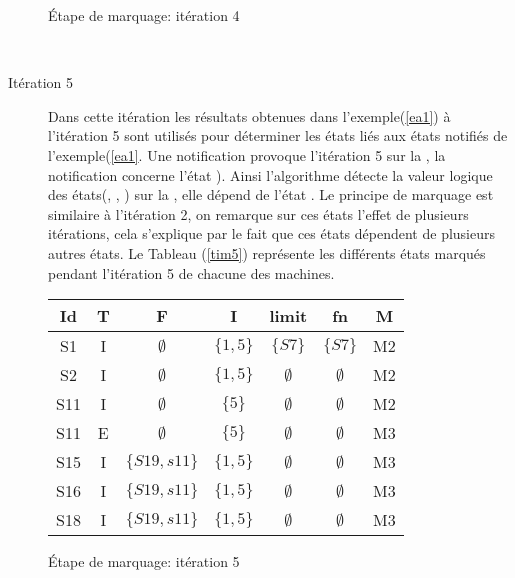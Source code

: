 \begin{Exemple}
\begin{description}
\begin{tableth}
\begin{tabular}{|*{7}{c|}}
	\end{tabular}
	\caption{Étape de marquage: itération 4}\label{tim4}
\end{tableth}\\

	\item[Itération 5] Dans cette itération les résultats obtenues dans l'exemple(\ref{ea1}) à l'itération 5 sont utilisés pour déterminer les états liés aux états notifiés de l'exemple(\ref{ea1}. Une notification provoque l'itération 5 sur la \mtree{}, la notification concerne l'état ). Ainsi l'algorithme détecte la valeur logique des états(, , ) sur la \mtree{}, elle dépend de l'état . Le principe de marquage est similaire à l'itération 2, on remarque sur ces états l'effet de plusieurs itérations, cela s'explique par le fait que ces états dépendent de plusieurs autres états. Le Tableau (\ref{tim5}) représente les différents états marqués pendant l'itération 5 de chacune des machines.
	\begin{tableth}
	\centering
	\begin{tabular}{|*{7}{c|}}
		\hline
		Id&		T&			F&	I&	limit&	fn&		M\\
		\hline
		S1&		I&$\emptyset$&		$\{1 ,5\}$&	$\{S7\}$&	$\{S7\}$&		M2\\ \hline
		S2&		I&$\emptyset$&		$\{1 ,5\}$&$\emptyset$&$\emptyset$&		M2\\ \hline
		S11&	I&$\emptyset$&		$\{5\}$	&$\emptyset$&$\emptyset$&		M2\\ \hline
		S11& 	E&$\emptyset$&		$\{5\}$&$\emptyset$&$\emptyset$&		M3\\ \hline
		S15&	I&	$\{S19,s11\}$&	$\{1 ,5\}$&$\emptyset$&$\emptyset$&		M3\\ \hline
		S16&	I&	$\{S19,s11\}$&	$\{1 ,5\}$&$\emptyset$&$\emptyset$&		M3\\ \hline
		S18&	I&	$\{S19,s11\}$&	$\{1 ,5\}$&$\emptyset$&$\emptyset$&		M3\\ \hline
	\end{tabular}
	\caption{Étape de marquage: itération 5}\label{tim5}
\end{tableth}\\

\end{description}	
\end{Exemple}
